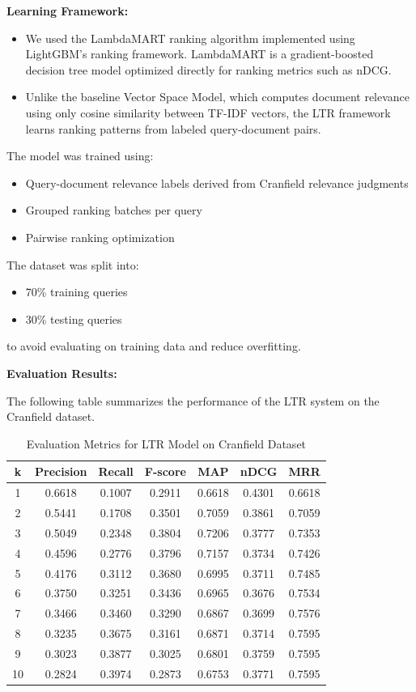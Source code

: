 \documentclass{article}
\begin{document}
\textbf{Learning Framework:}
\begin{itemize}
\item We used the LambdaMART ranking algorithm implemented using LightGBM’s ranking framework. LambdaMART is a gradient-boosted decision tree model optimized directly for ranking metrics such as nDCG.

\item Unlike the baseline Vector Space Model, which computes document relevance using only cosine similarity between TF-IDF vectors, the LTR framework learns ranking patterns from labeled query-document pairs.
\end{itemize}
The model was trained using:
\begin{itemize}
    \item Query-document relevance labels derived from Cranfield relevance judgments
    \item Grouped ranking batches per query
    \item Pairwise ranking optimization
\end{itemize}

The dataset was split into:
\begin{itemize}
    \item 70\% training queries
    \item 30\% testing queries
\end{itemize}

to avoid evaluating on training data and reduce overfitting.

\textbf{Evaluation Results:}

The following table summarizes the performance of the LTR system on the Cranfield dataset.

\begin{table}[H]
\centering
\begin{tabular}{|c|c|c|c|c|c|c|}
\hline
k & Precision & Recall & F-score & MAP & nDCG & MRR \\
\hline
1 & 0.6618 & 0.1007 & 0.2911 & 0.6618 & 0.4301 & 0.6618 \\
2 & 0.5441 & 0.1708 & 0.3501 & 0.7059 & 0.3861 & 0.7059 \\
3 & 0.5049 & 0.2348 & 0.3804 & 0.7206 & 0.3777 & 0.7353 \\
4 & 0.4596 & 0.2776 & 0.3796 & 0.7157 & 0.3734 & 0.7426 \\
5 & 0.4176 & 0.3112 & 0.3680 & 0.6995 & 0.3711 & 0.7485 \\
6 & 0.3750 & 0.3251 & 0.3436 & 0.6965 & 0.3676 & 0.7534 \\
7 & 0.3466 & 0.3460 & 0.3290 & 0.6867 & 0.3699 & 0.7576 \\
8 & 0.3235 & 0.3675 & 0.3161 & 0.6871 & 0.3714 & 0.7595 \\
9 & 0.3023 & 0.3877 & 0.3025 & 0.6801 & 0.3759 & 0.7595 \\
10 & 0.2824 & 0.3974 & 0.2873 & 0.6753 & 0.3771 & 0.7595 \\
\hline
\end{tabular}
\caption{Evaluation Metrics for LTR Model on Cranfield Dataset}
\end{table}
\end{document}
